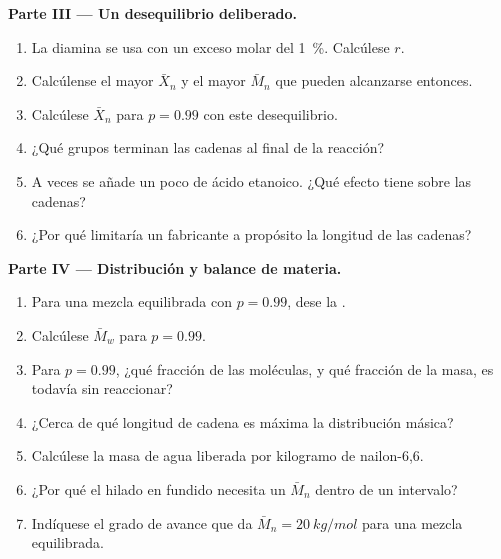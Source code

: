 \begin{problem}
\medskip
\noindent\textbf{Parte III --- Un desequilibrio deliberado.}
\begin{enumerate}[resume]
  \item La diamina se usa con un exceso molar del 1~\%. Calcúlese $r$.
  \item Calcúlense el mayor $\bar X_n$ y el mayor $\bar M_n$ que pueden alcanzarse entonces.
  \item Calcúlese $\bar X_n$ para $p = 0.99$ con este desequilibrio.
  \item ¿Qué grupos terminan las cadenas al final de la reacción?
  \item A veces se añade un poco de ácido etanoico. ¿Qué efecto tiene sobre las cadenas?
  \item ¿Por qué limitaría un fabricante a propósito la longitud de las cadenas?
\end{enumerate}

\medskip
\noindent\textbf{Parte IV --- Distribución y balance de materia.}
\begin{enumerate}[resume]
  \item Para una mezcla equilibrada con $p = 0.99$, dese la .
  \item Calcúlese $\bar M_w$ para $p = 0.99$.
  \item Para $p = 0.99$, ¿qué fracción de las moléculas, y qué fracción de la masa, es todavía
         sin reaccionar?
  \item ¿Cerca de qué longitud de cadena es máxima la distribución másica?
  \item Calcúlese la masa de agua liberada por kilogramo de nailon-6,6.
  \item ¿Por qué el hilado en fundido necesita un $\bar M_n$ dentro de un intervalo?
  \item Indíquese el grado de avance que da $\bar M_n = \qty{20}{kg/mol}$ para una mezcla equilibrada.
\end{enumerate}
\end{problem}
